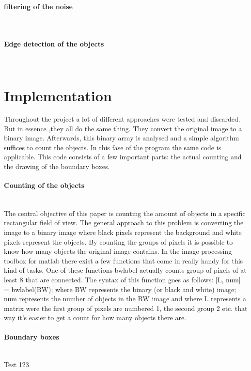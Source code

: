 \documentclass[11pt]{article}
\begin{document}
\paragraph{filtering of the noise}\mbox{}\\

\paragraph{Edge detection of the objects}\mbox{}\\

\section{Implementation}
Throughout the project a lot of different approaches were tested and discarded. But in essence ,they all do the same thing. They convert the original image to a binary image. Afterwards, this binary array is analysed and a simple algorithm suffices to count the objects. In this fase of the program the same code is applicable. This code consists of a few important parts: the actual counting and the drawing of the boundary boxes. 
\paragraph{Counting of the objects}\mbox{}\\
The central objective of this paper is counting the amount of objects in a specific rectangular field of view. The general approach to this problem is converting the image to a binary image where black pixels represent the background and white pixels represent the objects. By counting the groups of pixels it is possible to know how many objects the original image contains. In the image processing toolbox for matlab there exist a few functions that come in really handy for this kind of tasks. One of these functions bwlabel actually counts group of pixels of at least 8 that are connected. The syntax of this function goes as follows: [L, num] = bwlabel(BW); where BW represents the binary (or black and white) image; num represents the number of objects in the BW image and where L represents a matrix were the first group of pixels are numbered 1, the second group 2 etc. that way it's easier to get a count for how many objects there are.

\paragraph{Boundary boxes}\mbox{}\\
Test 123
\end{document}
